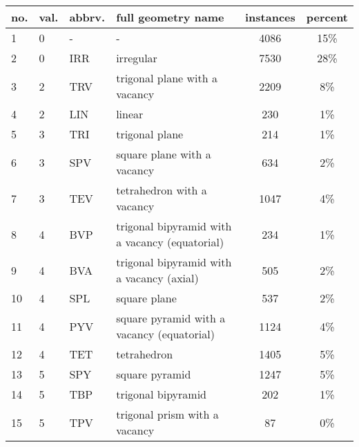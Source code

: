 \begin{tabular}{l l l l c c}
	\toprule
	no. & val. & abbrv. & full geometry name	& instances & percent \\
	\midrule
	1   & 0       & -     & -                                                                       & 4086      & 15\%     \\
	2   & 0       & IRR   & irregular                                                               & 7530      & 28\%     \\
	3   & 2       & TRV   & trigonal plane with a vacancy                                           & 2209      & 8\%      \\
	4   & 2       & LIN   & linear                                                                  & 230       & 1\%      \\
	5   & 3       & TRI   & trigonal plane                                                          & 214       & 1\%      \\
	6   & 3       & SPV   & square plane with a vacancy                                             & 634       & 2\%      \\
	7   & 3       & TEV   & tetrahedron with a vacancy                                              & 1047      & 4\%      \\
	8   & 4       & BVP   & trigonal bipyramid with a vacancy (equatorial)                          & 234       & 1\%      \\
	9   & 4       & BVA   & trigonal bipyramid with a vacancy (axial)                               & 505       & 2\%      \\
	10  & 4       & SPL   & square plane                                                            & 537       & 2\%      \\
	11  & 4       & PYV   & square pyramid with a vacancy (equatorial)                              & 1124      & 4\%      \\
	12  & 4       & TET   & tetrahedron                                                             & 1405      & 5\%      \\
	13  & 5       & SPY   & square pyramid                                                          & 1247      & 5\%      \\
	14  & 5       & TBP   & trigonal bipyramid                                                      & 202       & 1\%      \\
	15  & 5       & TPV   & trigonal prism with a vacancy                                           & 87        & 0\%      \\

\end{tabular}
